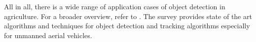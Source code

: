 All in all, there is a wide range of application cases of object detection in agriculture. For a broader overview, refer to \cite{applications_review}. The survey provides state of the art algorithms and techniques for object detection and tracking algorithms especially for unmanned aerial vehicles. 